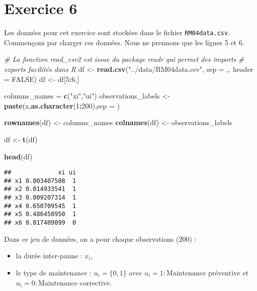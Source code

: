 \documentclass[
]{article}
\author{}
\date{\vspace{-2.5em}}
\newenvironment{Shaded}{\begin{snugshade}}{\end{snugshade}}
\newcommand{\AttributeTok}[1]{\textcolor[rgb]{0.13,0.29,0.53}{#1}}
\newcommand{\CommentTok}[1]{\textcolor[rgb]{0.56,0.35,0.01}{\textit{#1}}}
\newcommand{\ConstantTok}[1]{\textcolor[rgb]{0.56,0.35,0.01}{#1}}
\newcommand{\DecValTok}[1]{\textcolor[rgb]{0.00,0.00,0.81}{#1}}
\newcommand{\FunctionTok}[1]{\textcolor[rgb]{0.13,0.29,0.53}{\textbf{#1}}}
\newcommand{\NormalTok}[1]{#1}
\newcommand{\OtherTok}[1]{\textcolor[rgb]{0.56,0.35,0.01}{#1}}
\newcommand{\SpecialCharTok}[1]{\textcolor[rgb]{0.81,0.36,0.00}{\textbf{#1}}}
\newcommand{\StringTok}[1]{\textcolor[rgb]{0.31,0.60,0.02}{#1}}
\providecommand{\tightlist}{%
  \setlength{\itemsep}{0pt}\setlength{\parskip}{0pt}}
\begin{document}
\newpage

\section{Exercice 6}\label{exercice-6}

Les données pour cet exercice sont stockées dans le fichier
\texttt{RM04data.csv}. Commençons par charger ces données. Nous ne
prennons que les lignes 5 et 6.

\begin{Shaded}
\begin{Highlighting}[]
\CommentTok{\# La fonction read\_csv2 est issue du package readr qui permet des imports}
\CommentTok{\# exports facilités dans R}
\NormalTok{df }\OtherTok{\textless{}{-}} \FunctionTok{read.csv}\NormalTok{(}\StringTok{"../data/RM04data.csv"}\NormalTok{, }\AttributeTok{sep =} \StringTok{\textquotesingle{},\textquotesingle{}}\NormalTok{, }\AttributeTok{header =} \ConstantTok{FALSE}\NormalTok{)}
\NormalTok{df }\OtherTok{\textless{}{-}}\NormalTok{ df[}\DecValTok{5}\SpecialCharTok{:}\DecValTok{6}\NormalTok{,]}

\NormalTok{columns\_names }\OtherTok{=} \FunctionTok{c}\NormalTok{(}\StringTok{"xi"}\NormalTok{,}\StringTok{"ui"}\NormalTok{)}
\NormalTok{observations\_labels }\OtherTok{\textless{}{-}} \FunctionTok{paste}\NormalTok{(}\StringTok{\textquotesingle{}x\textquotesingle{}}\NormalTok{,}\FunctionTok{as.character}\NormalTok{(}\DecValTok{1}\SpecialCharTok{:}\DecValTok{200}\NormalTok{),}\AttributeTok{sep =} \StringTok{\textquotesingle{}\textquotesingle{}}\NormalTok{)}

\FunctionTok{rownames}\NormalTok{(df) }\OtherTok{\textless{}{-}}\NormalTok{ columns\_names}
\FunctionTok{colnames}\NormalTok{(df) }\OtherTok{\textless{}{-}}\NormalTok{ observations\_labels}

\NormalTok{df }\OtherTok{\textless{}{-}} \FunctionTok{t}\NormalTok{(df)}

\FunctionTok{head}\NormalTok{(df)}
\end{Highlighting}
\end{Shaded}

\begin{verbatim}
##             xi ui
## x1 0.003407508  1
## x2 0.014933541  1
## x3 0.009207314  1
## x4 0.650709545  1
## x5 0.486458950  1
## x6 0.017409099  0
\end{verbatim}

Dans ce jeu de données, on a pour chaque observations (200) :

\begin{itemize}
\tightlist
\item
  la durée inter-panne : \(x_i\),
\item
  le type de maintenance : \(u_i = \{0,1\}\) avec
  \(u_i = 1: \mbox{Maintenance préventive}\) et
  \(u_i = 0: \mbox{Maintenance corrective}\).
\end{itemize}
\end{document}
